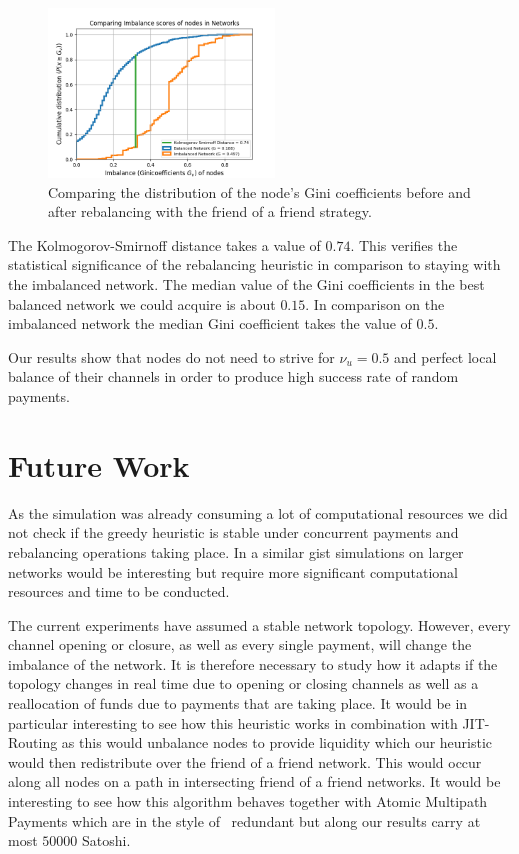 \documentclass[conference]{IEEEtran}
\begin{document}
\begin{figure}
 \centering
 \includegraphics[width=6cm]{code/vs/fig/comparison distribution of Ginicoefficients.png}
 \caption{Comparing the distribution of the node's Gini coefficients before and after rebalancing with the friend of a friend strategy.}
 \label{fig:cdf_gini}
 \end{figure}

The Kolmogorov-Smirnoff distance takes a value of $0.74$.
This verifies the statistical significance of the rebalancing heuristic in comparison to staying with the imbalanced network.
The median value of the Gini coefficients in the best balanced network we could acquire is about $0.15$.
In comparison on the imbalanced network the median Gini coefficient takes the value of $0.5$.

Our results show that nodes do not need to strive for $\nu_u = 0.5$ and perfect local balance of their channels in order to produce high success rate of random payments.

\section{Future Work}
\label{sec:future}

As the simulation was already consuming a lot of computational resources we did not check if the greedy heuristic is stable under concurrent payments and rebalancing operations taking place.
In a similar gist simulations on larger networks would be interesting but require more significant computational resources and time to be conducted.

The current experiments have assumed a stable network topology. 
However, every channel opening or closure, as well as every single payment, will change the imbalance of the network.
It is therefore necessary to study how it adapts if the topology changes in real time due to opening or closing channels as well as a reallocation of funds due to payments that are taking place.
It would be in particular interesting to see how this heuristic works in combination with JIT-Routing as this would unbalance nodes to provide liquidity which our heuristic would then redistribute over the friend of a friend network.
This would occur along all nodes on a path in intersecting friend of a friend networks.
It would be interesting to see how this algorithm behaves together with Atomic Multipath Payments which are in the style of~\cite{bagaria2019boomerang} redundant but along our results carry at most $50000$ Satoshi. 
\end{document}
